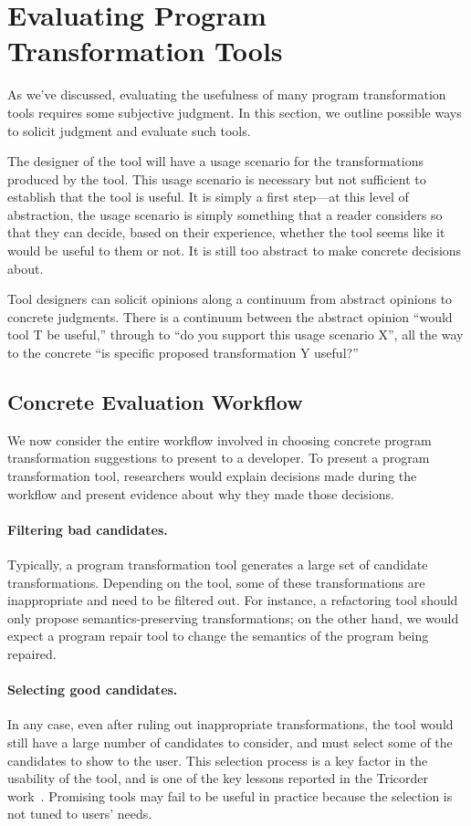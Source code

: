 \section{Evaluating Program Transformation Tools}
\label{sec:how-to-evaluate}
As we've discussed, evaluating the usefulness of many program
transformation tools requires some subjective judgment. In this
section, we outline possible ways to solicit judgment and evaluate
such tools.

The designer of the tool will have a usage scenario for the
transformations produced by the tool. This usage scenario is necessary
but not sufficient to establish that the tool is useful.  It is simply
a first step---at this level of abstraction, the usage scenario is
simply something that a reader considers so that they can decide,
based on their experience, whether the tool seems like it would be
useful to them or not.  It is still too abstract to make concrete
decisions about.

Tool designers can solicit opinions along a continuum from abstract
opinions to concrete judgments. There is a continuum between the
abstract opinion ``would tool T be useful,'' through to ``do you
support this usage scenario X'', all the way to the concrete ``is
specific proposed transformation Y useful?''

\subsection{Concrete Evaluation Workflow}
We now consider the entire workflow involved in choosing concrete
program transformation suggestions to present to a developer. To present
a program transformation tool, researchers would explain decisions made during
the workflow and present evidence about why they made those decisions.

\paragraph{Filtering bad candidates.} Typically, a
program transformation tool generates a large set of candidate
transformations. Depending on the tool, some of these transformations
are inappropriate and need to be filtered out. For instance, a
refactoring tool should only propose semantics-preserving
transformations; on the other hand, we would expect a program repair
tool to change the semantics of the program being repaired.

\paragraph{Selecting good candidates.} In any case, even after ruling out 
inappropriate transformations, the tool would still have a large
number of candidates to consider, and must select some of the
candidates to show to the user. This selection process is a key factor
in the usability of the tool, and is one of the key lessons reported
in the Tricorder
work~\cite{sadowski18:_lesson_build_static_analy_tools_googl}.
Promising tools may fail to be useful in practice because the
selection is not tuned to users' needs.

